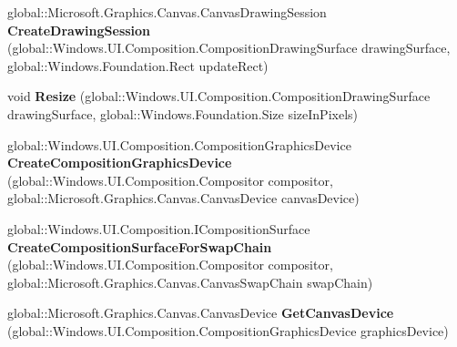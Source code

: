 \begin{DoxyCompactItemize}
global\+::\+Microsoft.\+Graphics.\+Canvas.\+Canvas\+Drawing\+Session {\bfseries Create\+Drawing\+Session} (global\+::\+Windows.\+U\+I.\+Composition.\+Composition\+Drawing\+Surface drawing\+Surface, global\+::\+Windows.\+Foundation.\+Rect update\+Rect)
\item 
\mbox{\label{interface_microsoft_1_1_graphics_1_1_canvas_1_1_u_i_1_1_composition_1_1_i_canvas_composition_statics_aa321ab037c7b505b333681f0b3bdc829}} 
void {\bfseries Resize} (global\+::\+Windows.\+U\+I.\+Composition.\+Composition\+Drawing\+Surface drawing\+Surface, global\+::\+Windows.\+Foundation.\+Size size\+In\+Pixels)
\item 
\mbox{\label{interface_microsoft_1_1_graphics_1_1_canvas_1_1_u_i_1_1_composition_1_1_i_canvas_composition_statics_abc5bb79cc44eecbedc66ea29c5052d3d}} 
global\+::\+Windows.\+U\+I.\+Composition.\+Composition\+Graphics\+Device {\bfseries Create\+Composition\+Graphics\+Device} (global\+::\+Windows.\+U\+I.\+Composition.\+Compositor compositor, global\+::\+Microsoft.\+Graphics.\+Canvas.\+Canvas\+Device canvas\+Device)
\item 
\mbox{\label{interface_microsoft_1_1_graphics_1_1_canvas_1_1_u_i_1_1_composition_1_1_i_canvas_composition_statics_a6803bff12a2a0f2d9c35cdac60868b7b}} 
global\+::\+Windows.\+U\+I.\+Composition.\+I\+Composition\+Surface {\bfseries Create\+Composition\+Surface\+For\+Swap\+Chain} (global\+::\+Windows.\+U\+I.\+Composition.\+Compositor compositor, global\+::\+Microsoft.\+Graphics.\+Canvas.\+Canvas\+Swap\+Chain swap\+Chain)
\item 
\mbox{\label{interface_microsoft_1_1_graphics_1_1_canvas_1_1_u_i_1_1_composition_1_1_i_canvas_composition_statics_ad6745a005de8b7c161ff1c151591a3bb}} 
global\+::\+Microsoft.\+Graphics.\+Canvas.\+Canvas\+Device {\bfseries Get\+Canvas\+Device} (global\+::\+Windows.\+U\+I.\+Composition.\+Composition\+Graphics\+Device graphics\+Device)
\item 
\mbox{\label{interface_microsoft_1_1_graphics_1_1_canvas_1_1_u_i_1_1_composition_1_1_i_canvas_composition_statics_a3fce2ed9ef29897b92f51b815d0c42d7}} 

\end{DoxyCompactItemize}
